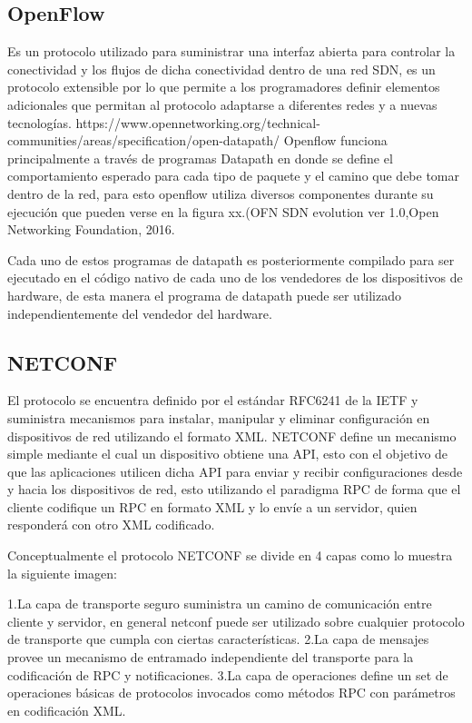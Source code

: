 \subsection{OpenFlow}
\label{sec:OpenFlow}

Es un protocolo utilizado para suministrar una interfaz abierta para controlar la conectividad y los flujos de dicha conectividad dentro de una red SDN, es un protocolo extensible por lo que permite a los programadores definir elementos adicionales que permitan al protocolo adaptarse a diferentes redes y a nuevas tecnologías. https://www.opennetworking.org/technical-communities/areas/specification/open-datapath/
Openflow funciona principalmente a través de programas Datapath en donde se define el comportamiento esperado para cada tipo de paquete y el camino que debe tomar dentro de la red, para esto openflow utiliza diversos componentes durante su ejecución que pueden verse en la figura xx.(OFN SDN evolution ver 1.0,Open Networking Foundation, 2016.

Cada uno de estos programas de datapath es posteriormente compilado para ser ejecutado en el código nativo de cada uno de los vendedores de los dispositivos de hardware, de esta manera el programa de datapath puede ser utilizado independientemente del vendedor del hardware.


\subsection{NETCONF}
\label{sec:NETCONF}

El protocolo se encuentra definido por el estándar RFC6241 de la IETF y suministra mecanismos para instalar, manipular y eliminar configuración en dispositivos de red utilizando el formato XML.
NETCONF define un mecanismo simple mediante el cual un dispositivo obtiene una API, esto con el objetivo de que las aplicaciones utilicen dicha API para enviar y recibir configuraciones desde y hacia los dispositivos de red, esto utilizando el paradigma RPC de forma que el cliente codifique un RPC en formato XML y lo envíe a un servidor, quien responderá con otro XML codificado.

Conceptualmente el protocolo NETCONF se divide en 4 capas como lo muestra la siguiente imagen:


1.La capa de transporte seguro suministra un camino de comunicación entre cliente y servidor, en general netconf puede ser utilizado sobre cualquier protocolo de transporte que cumpla con ciertas características.
2.La capa de mensajes provee un mecanismo de entramado independiente del transporte para la codificación de RPC y notificaciones.
3.La capa de operaciones define un set de operaciones básicas de protocolos invocados como métodos RPC con parámetros en codificación XML.

